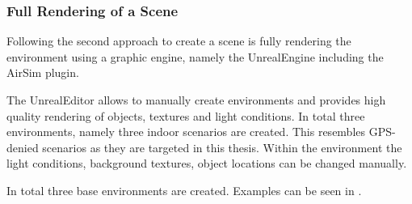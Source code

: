 \subsubsection{Full Rendering of a Scene}

Following \cite{Ros2016, Gaidon2016, Johnson-Roberson2016, Tobin2017, Tremblay2018a} the second approach to create a scene is fully rendering the environment using a graphic engine, namely the UnrealEngine including the AirSim plugin.

The UnrealEditor allows to manually create environments and provides high quality rendering of objects, textures and light conditions. In total three environments, namely three indoor scenarios are created. This resembles GPS-denied scenarios as they are targeted in this thesis. Within the environment the light conditions, background textures, object locations can be changed manually.

In total three base environments are created. Examples can be seen in .

